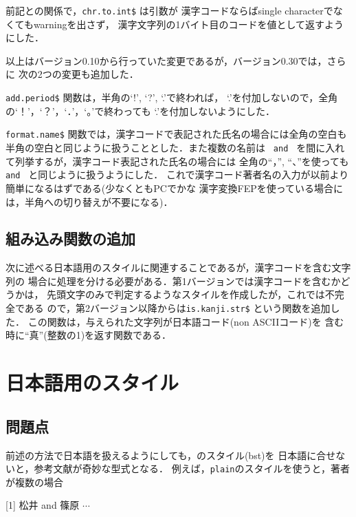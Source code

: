 前記との関係で，{\tt chr.to.int\$} は引数が
漢字コードならばsingle characterでなくてもwarningを出さず，
漢字文字列の1バイト目のコードを値として返すようにした．

以上はバージョン0.10から行っていた変更であるが，バージョン0.30では，さらに
次の2つの変更も追加した．

{\tt add.period\$} 関数は，半角の`!'$\!$, `?'$\!$, `.'で終われば，
`.'を付加しないので，全角の`！'，`？'，`．'，`。'で終わっても
`.'を付加しないようにした．

{\tt format.name\$} 関数では，漢字コードで表記された氏名の場合には全角の空白も
半角の空白と同じように扱うこととした．また複数の名前は \verb*| and |
を間に入れて列挙するが，漢字コード表記された氏名の場合には
全角の``，'', ``、''を使っても \verb*| and | と同じように扱うようにした．
これで漢字コード著者名の入力が以前より簡単になるはずである(少なくともPCでかな
漢字変換FEPを使っている場合には，半角への切り替えが不要になる)．

\subsection{組み込み関数の追加}

次に述べる日本語用のスタイルに関連することであるが，漢字コードを含む文字列の
場合に処理を分ける必要がある．第1バージョンでは漢字コードを含むかどうかは，
先頭文字のみで判定するようなスタイルを作成したが，これでは不完全である
ので，第2バージョン以降からは{\tt is.kanji.str\$} という関数を追加した．
この関数は，与えられた文字列が日本語コード(non ASCIIコード)を
含む時に``真''(整数の1)を返す関数である．

\newpage
\section{日本語用のスタイル}

\subsection{問題点}
前述の方法で日本語を扱えるようにしても，\BibTeX のスタイル(bst)を
日本語に合せないと，参考文献が奇妙な型式となる．
例えば，{\tt plain}のスタイルを使うと，著者が複数の場合

\vskip 2mm
\hskip1cm
[1] 松井 and 篠原 $\cdots$
\vskip 2mm

